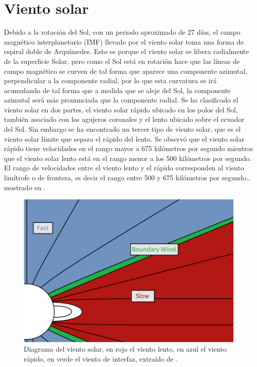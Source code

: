 \section{Viento solar}
Debido a la rotación del Sol, con un periodo aproximado de 27 días, el campo magnético interplanetario (IMF) llevado por el viento solar toma una forma de espiral doble de Arquímedes. Esto es porque el viento solar se libera radialmente de la superficie Solar, pero como el Sol está en rotación hace que las líneas de campo magnético se curven de tal forma que aparece una componente azimutal, perpendicular a la componente radial, por lo que esta curvatura se irá acumulando de tal forma que a medida que se aleje del Sol, la componente azimutal será más pronunciada que la componente radial. 
Se ha clasificado el viento solar en dos partes, el viento solar rápido ubicado en los polos del Sol, también asociado con los agujeros coronales y el lento ubicado sobre el ecuador del Sol. Sin embargo se ha encontrado un tercer tipo de viento solar, que es el viento solar límite que separa el rápido del lento. Se observó que el viento solar rápido tiene velocidades en el rango mayor a 675 kilómetros por segundo mientras que el viento solar lento está en el rango menor a los 500 kilómetros por segundo. El rango de velocidades entre el viento lento y el rápido corresponden al viento limítrofe o de frontera, es decir el rango entre 500 y 675 kilómetros por segundo., mostrado en \cite[e.g.,][]{stakhiv-2015}.
\begin{figure}
    \centering
    \includegraphics[width=0.7\linewidth]{Imagenes Mein/viento solar.png}
    \caption[Distribución del viento solar (lento, de interfaz, rápido) al rededor del Sol]{Diagrama del viento solar, en rojo el viento lento, en azul el viento rápido, en verde el viento de interfaz, extraído de \cite{stakhiv-2015}.}
    \label{fig:placeholder}
\end{figure}



